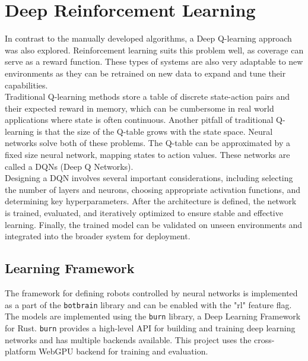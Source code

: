 
\section{Deep Reinforcement Learning}
\label{sec:rl}
In contrast to the manually developed algorithms, a Deep Q-learning approach was also explored. Reinforcement learning suits this problem well, as coverage can serve as a reward function. These types of systems are also very adaptable to new environments as they can be retrained on new data to expand and tune their capabilities. \\

Traditional Q-learning methods store a table of discrete state-action pairs and their expected reward in memory, which can be cumbersome in real world applications where state is often continuous. Another pitfall of traditional Q-learning is that the size of the Q-table grows with the state space. Neural networks solve both of these problems. The Q-table can be approximated by a fixed size neural network, mapping states to action values. These networks are called a DQNs (Deep Q Networks). \\

Designing a DQN involves several important considerations, including selecting the number of layers and neurons, choosing appropriate activation functions, and determining key hyperparameters. After the architecture is defined, the network is trained, evaluated, and iteratively optimized to ensure stable and effective learning. Finally, the trained model can be validated on unseen environments and integrated into the broader system for deployment.


\subsection{Learning Framework}
The framework for defining robots controlled by neural networks is implemented as a part of the \texttt{botbrain} library and can be enabled with the "rl" feature flag. The models are implemented using the \texttt{burn} \cite{burn} library, a Deep Learning Framework for Rust. \texttt{burn} provides a high-level API for building and training deep learning networks and has multiple backends available. This project uses the cross-platform WebGPU backend \cite{wgpu} for training and evaluation. \\

